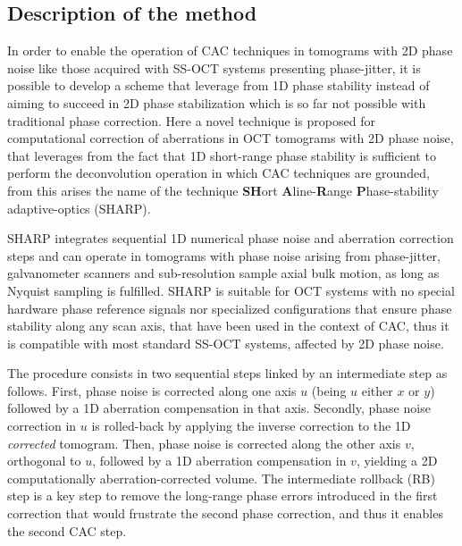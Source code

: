 \subsection{Description of the method}

In order to enable the operation of CAC techniques in tomograms with 2D phase noise like those acquired with SS-OCT systems presenting phase-jitter, it is possible to develop a scheme that leverage from 1D phase stability instead of aiming to succeed in 2D phase stabilization which is so far not possible with traditional phase correction. Here a novel technique is proposed for computational correction of aberrations in OCT tomograms with 2D phase noise, that leverages from the fact that 1D short-range phase stability is sufficient to perform the deconvolution operation in which CAC techniques are grounded, from this arises the name of the technique \textbf{SH}ort \textbf{A}line-\textbf{R}ange \textbf{P}hase-stability adaptive-optics (SHARP).

SHARP integrates sequential 1D numerical phase noise and aberration correction steps and can operate in tomograms with phase noise arising from phase-jitter, galvanometer scanners and sub-resolution sample axial bulk motion, as long as Nyquist sampling is fulfilled. SHARP is suitable for OCT systems with no special hardware phase reference signals nor specialized configurations that ensure phase stability along any scan axis, that have been used in the context of CAC, thus it is compatible with most standard SS-OCT systems, affected by 2D phase noise.

The procedure consists in two sequential steps linked by an intermediate step as follows. First, phase noise is corrected along one axis $u$ (being $u$ either $x$ or $y$) followed by a 1D aberration compensation in that axis. Secondly, phase noise correction in $u$ is rolled-back by applying the inverse correction to the 1D \emph{corrected} tomogram. Then, phase noise is corrected along the other axis $v$, orthogonal to $u$, followed by a 1D aberration compensation in $v$, yielding a 2D computationally aberration-corrected volume. The intermediate rollback (RB) step is a key step to remove the long-range phase errors introduced in the first correction that would frustrate the second phase correction, and thus it enables the second CAC step.

